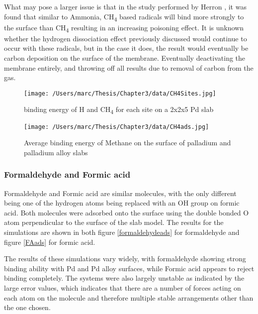 What may pose a larger issue is that in the study performed by Herron \cite{HERRON20121670}, it was found that similar to Ammonia, CH\textsubscript{4} based radicals will bind more strongly to the surface than CH\textsubscript{4} resulting in an increasing poisoning effect. It is unknown whether the hydrogen dissociation effect previously discussed would continue to occur with these radicals, but in the case it does, the result would eventually be carbon deposition on the surface of the membrane. Eventually deactivating the membrane entirely, and throwing off all results due to removal of carbon from the gas.  

\begin{figure}
  \centering
  \texttt{[image: /Users/marc/Thesis/Chapter3/data/CH4Sites.jpg]}
  \caption{binding energy of H and CH\textsubscript{4} for each site on a 2x2x5 Pd slab}
  \label{CH4site}
\end{figure}

\begin{landscape}
  \begin{figure}
      \centering
      \texttt{[image: /Users/marc/Thesis/Chapter3/data/CH4ads.jpg]}
      \caption{Average binding energy of Methane on the surface of palladium and palladium alloy slabs}
      \label{CH4ads}
    \end{figure}
  
  \end{landscape}
\subsubsection{Formaldehyde and Formic acid}

Formaldehyde and Formic acid are similar molecules, with the only different being one of the hydrogen atoms being replaced with an OH group on formic acid. Both molecules were adsorbed onto the surface using the double bonded O atom perpendicular to the surface of the slab model.\cite{C8RA04983A} The results for the simulations are shown in both figure \ref{formaldehydeads} for formaldehyde and figure \ref{FAads} for formic acid. 

The results of these simulations vary widely, with formaldehyde showing strong binding ability with Pd and Pd alloy surfaces, while Formic acid appears to reject binding completely. The systems were also largely unstable as indicated by the large error values, which indicates that there are a number of forces acting on each atom on the molecule and therefore multiple stable arrangements other than the one chosen.

